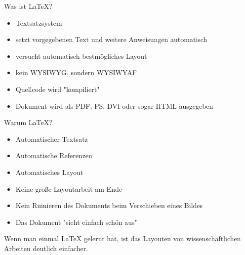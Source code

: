 \documentclass[presentation,aspectratio=169]{beamer}
\begin{document}
\begin{frame}{Was ist \LaTeX?}
  \begin{itemize}
    \item Textsatzsystem
    \item setzt vorgegebenen Text und weitere Anweisungen automatisch
    \item versucht automatisch bestmögliches Layout
    \item kein WYSIWYG, sondern WYSIWYAF
    \item Quellcode wird "kompiliert"
    \item Dokument wird als PDF, PS, DVI oder sogar HTML ausgegeben
  \end{itemize}
\end{frame}

\begin{frame}{Warum \LaTeX?}
  \begin{minipage}{.4\textwidth}
    \begin{itemize}
      \item Automatischer Textsatz
      \item Automatische Referenzen
      \item Automatisches Layout
    \end{itemize}
  \end{minipage}
  \begin{minipage}{.5\textwidth}
    \begin{itemize}
      \item Keine große Layoutarbeit am Ende
      \item Kein Ruinieren des Dokuments beim Verschieben eines Bildes
      \item Das Dokument "sieht einfach schön aus"
    \end{itemize}
  \end{minipage}
  \begin{center}
    Wenn man einmal \LaTeX{} gelernt hat, ist das Layouten von wissenschaftlichen Arbeiten deutlich einfacher.
  \end{center}
\end{frame}
\end{document}
